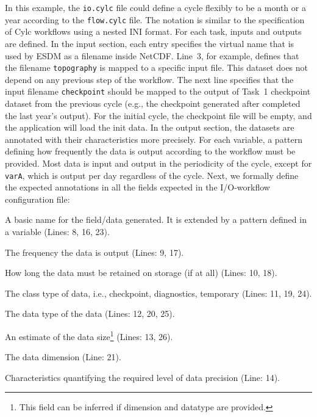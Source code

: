 \documentclass{superfri}
\begin{document}
In this example, the \texttt{io.cylc} file could define a cycle flexibly to be a month or a year according to the \texttt{flow.cylc} file.
The notation is similar to the specification of Cylc workflows using a nested INI format.
For each task, inputs and outputs are defined.
In the input section, each entry specifies the virtual name that is used by ESDM as a filename inside NetCDF.
Line~3, for example, defines that the filename \texttt{topography} is mapped to a specific input file.
This dataset does not depend on any previous step of the workflow.
The next line specifies that the input filename \texttt{checkpoint} should be mapped to the output of Task~1 checkpoint dataset from the previous cycle (e.g., the checkpoint generated after completed the last year's output).
For the initial cycle, the checkpoint file will be empty, and the application will load the init data.
In the output section, the datasets are annotated with their characteristics more precisely.
For each variable, a pattern defining how frequently the data is output according to the workflow must be provided.
Most data is input and output in the periodicity of the cycle, except for \texttt{varA}, which is output per day regardless of the cycle.
Next, we formally define the expected annotations in all the fields expected in the I/O-workflow configuration file:

\begin{description}[itemsep=0pt]

  \item[Name] A basic name for the field/data generated. It is extended by a pattern defined in a variable (Lines: 8, 16, 23).

  \item[Pattern] The frequency the data is output (Lines: 9, 17).

  \item[Lifetime] How long the data must be retained on storage (if at all) (Lines: 10, 18).

  \item[Type] The class type of data, i.e., checkpoint, diagnostics, temporary (Lines: 11, 19, 24).

  \item[Datatype] The data type of the data (Lines: 12, 20, 25).

  \item[Size] An estimate of the data size\footnote{This field can be inferred if dimension and datatype are provided.} (Lines: 13, 26).

  \item[Dimension] The data dimension (Line: 21).

  \item[Accuracy] Characteristics quantifying the required level of data precision (Line: 14).

\end{description}
\end{document}
